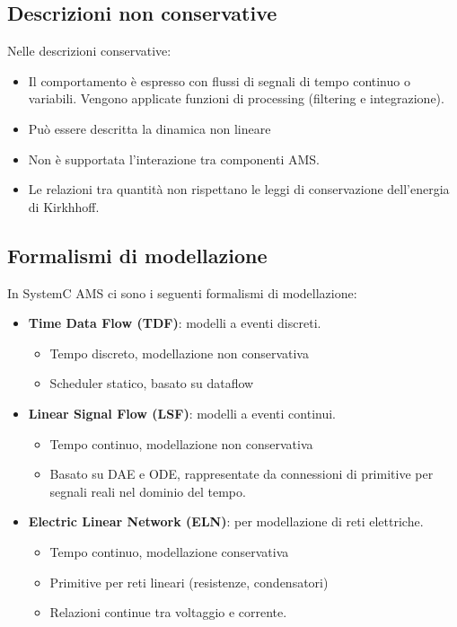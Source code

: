 \documentclass[a4paper]{article}
\begin{document}
		\subsection{Descrizioni non conservative}
		Nelle descrizioni conservative:
		\begin{itemize}
			\item Il comportamento è espresso con flussi di segnali di tempo continuo o variabili. Vengono applicate funzioni di processing (filtering e integrazione).
			\item Può essere descritta la dinamica non lineare
			\item Non è supportata l'interazione tra componenti AMS.
			\item Le relazioni tra quantità non rispettano le leggi di conservazione dell'energia di Kirkhhoff.
		\end{itemize}
		
		
		\subsection{Formalismi di modellazione}
			In SystemC AMS ci sono i seguenti formalismi di modellazione:
			\begin{itemize}
				\item \textbf{Time Data Flow (TDF)}: modelli a eventi discreti.
				\begin{itemize}
					\item Tempo discreto, modellazione non conservativa
					\item Scheduler statico, basato su dataflow
				\end{itemize}
				\item \textbf{Linear Signal Flow (LSF)}: modelli a eventi continui.
				\begin{itemize}
					\item Tempo continuo, modellazione non conservativa
					\item Basato su DAE e ODE, rappresentate da connessioni di primitive per segnali reali nel dominio del tempo.
				\end{itemize}
				\item \textbf{Electric Linear Network (ELN)}: per modellazione di reti elettriche.
				\begin{itemize}
					\item Tempo continuo, modellazione conservativa
					\item Primitive per reti lineari (resistenze, condensatori)
					\item Relazioni continue tra voltaggio e corrente.
				\end{itemize}
			\end{itemize}
			
\end{document}
